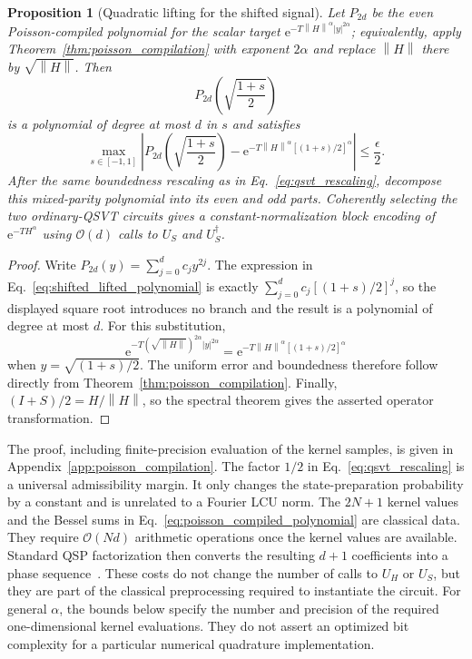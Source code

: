 \documentclass[aps,pra,reprint,floatfix,unsortedaddress,superscriptaddress]{revtex4-2}
\newtheorem{proposition}[theorem]{Proposition}
\newcommand{\norm}[1]{\left\lVert#1\right\rVert}
\newcommand{\abs}[1]{\left\lvert#1\right\rvert}
\newcommand{\Ocal}{\mathcal{O}}
\begin{document}
\begin{proposition}[Quadratic lifting for the shifted signal]
\label{prop:quadratic_lifting}
Let $P_{2d}$ be the even Poisson-compiled polynomial for the scalar
target
$\mathrm e^{-T\norm{H}^{\alpha}\abs{y}^{2\alpha}}$; equivalently,
apply Theorem~\ref{thm:poisson_compilation} with exponent $2\alpha$
and replace $\norm{H}$ there by $\sqrt{\norm{H}}$.  Then
\begin{equation}
    P_{2d}\!\left(\sqrt{\frac{1+s}{2}}\right)
    \label{eq:shifted_lifted_polynomial}
\end{equation}
is a polynomial of degree at most $d$ in $s$ and satisfies
\begin{equation}
\max_{s\in[-1,1]}
\left|
P_{2d}\!\left(\sqrt{\frac{1+s}{2}}\right)
-
\mathrm e^{-T\norm{H}^{\alpha}[(1+s)/2]^\alpha}
\right|
\leq\frac{\epsilon}{2}.
\label{eq:shifted_lifted_error}
\end{equation}
    After the same boundedness rescaling as in
    Eq.~\eqref{eq:qsvt_rescaling}, decompose this mixed-parity polynomial
    into its even and odd parts.  Coherently selecting the two
    ordinary-QSVT circuits gives a constant-normalization block encoding
    of $\mathrm e^{-T H^\alpha}$ using $\Ocal(d)$ calls to $U_S$ and
    $U_S^\dagger$.
\end{proposition}

\begin{proof}
Write $P_{2d}(y)=\sum_{j=0}^{d}c_jy^{2j}$.  The expression in
Eq.~\eqref{eq:shifted_lifted_polynomial} is exactly
$\sum_{j=0}^{d}c_j[(1+s)/2]^j$, so the displayed square root introduces
no branch and the result is a polynomial of degree at most $d$.
For this substitution,
\begin{equation}
\mathrm e^{-T(\sqrt{\norm{H}})^{2\alpha}
\abs{y}^{2\alpha}}
=
\mathrm e^{-T\norm{H}^{\alpha}[(1+s)/2]^\alpha}
\end{equation}
when $y=\sqrt{(1+s)/2}$.  The uniform error and boundedness therefore
follow directly from Theorem~\ref{thm:poisson_compilation}.  Finally,
$(I+S)/2=H/\norm{H}$, so the spectral theorem gives the asserted
operator transformation.
\end{proof}

The proof, including finite-precision evaluation of the kernel
samples, is given in Appendix~\ref{app:poisson_compilation}.
The factor $1/2$ in Eq.~\eqref{eq:qsvt_rescaling} is a universal
admissibility margin.  It only changes the state-preparation
probability by a constant and is unrelated to a Fourier LCU norm.
The $2N+1$ kernel values and the Bessel sums in
Eq.~\eqref{eq:poisson_compiled_polynomial} are classical data.  They
require $\Ocal(Nd)$ arithmetic operations once the kernel values are
available.  Standard QSP factorization then converts the resulting
$d+1$ coefficients into a phase sequence~\cite{Gilyen2019qsvt,
haah2019product}.  These costs do not change the number of calls to
$U_H$ or $U_S$, but they are part of the classical preprocessing
required to instantiate the circuit.
For general $\alpha$, the bounds below specify the number and precision
of the required one-dimensional kernel evaluations.  They do not assert
an optimized bit complexity for a particular numerical quadrature
implementation.
\end{document}
